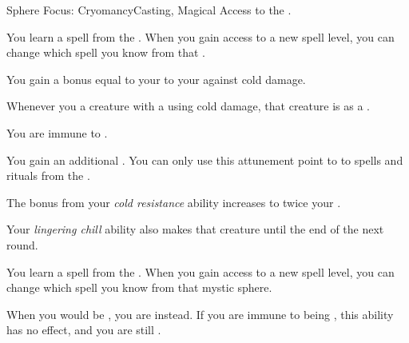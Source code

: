     \begin{feat}{Sphere Focus: Cryomancy}{Casting, Magical}
        \featpre Access to the  .

         You learn a spell from the  .
        When you gain access to a new spell level, you can change which spell you know from that .

         You gain a bonus equal to your  to your  against cold damage.

         Whenever you  a creature with a  using cold damage, that creature is  as a .

         You are immune to .

         You gain an additional .
        You can only use this attunement point to  to spells and rituals from the  .

         The bonus from your \textit{cold resistance} ability increases to twice your .

         Your \textit{lingering chill} ability also makes that creature  until the end of the next round.

         You learn a spell from the  .
        When you gain access to a new spell level, you can change which spell you know from that mystic sphere.

         When you would be , you are  instead.
        If you are immune to being , this ability has no effect, and you are still .
    \end{feat}

